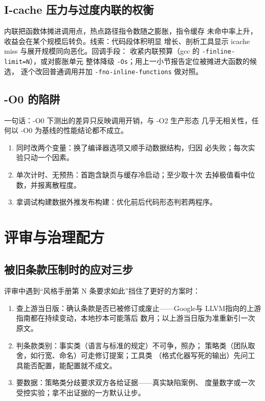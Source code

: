 \documentclass[12pt,a4paper,fontset=fandol]{ctexbook}
\newcommand{\Tp}[1]{\texttt{#1}}
\newcommand{\Lang}[1]{\textsf{#1}}
\newcommand{\DomGo}{\Lang{Google}}
\newcommand{\DomLlvm}{\Lang{LLVM}}
\begin{document}
\subsection{I-cache 压力与过度内联的权衡}

内联把函数体摊进调用点，热点路径指令数随之膨胀，指令缓存
未命中率上升，收益会在某个规模后转负。线索：代码段体积明显
增长、剖析工具显示 icache miss 与展开规模同向恶化。回调手段：
收紧内联预算（gcc 的 \Tp{-finline-limit=N}），或对膨胀单元
整体降级 \Tp{-Os}；用上一小节报告定位被摊进大函数的候选，
逐个改回普通调用并加 \Tp{-fno-inline-functions} 做对照。

\subsection{-O0 的陷阱}

一句话：-O0 下测出的差异只反映调用开销，与 -O2 生产形态
几乎无相关性，任何以 -O0 为基线的性能结论都不成立。

\begin{warning}[title={三条最常见的实验设计错误}]
\begin{enumerate}
\item 同时改两个变量：换了编译器选项又顺手动数据结构，归因
      必失败；每次实验只动一个因素。
\item 单次计时、无预热：首跑含缺页与缓存冷启动；至少取十次
      去掉极值看中位数，并报离散程度。
\item 拿调试构建数据外推发布构建：优化前后代码形态判若两程序。
\end{enumerate}
\end{warning}

\section{评审与治理配方}

\subsection{被旧条款压制时的应对三步}

评审中遇到``风格手册第 N 条要求如此''挡住了更好的方案时：

\begin{enumerate}
\item 查上游当日版：确认条款是否已被修订或废止——\DomGo 与
      \DomLlvm 指向的上游指南都在持续变动，本地抄本可能落后
      数月；以上游当日版为准重新引一次原文。
\item 判条款类别：事实类（语言与标准的规定）不可争，照办；
      策略类（团队取舍，如行宽、命名）可走修订提案；工具类
      （格式化器写死的输出）先问工具能否配置，能配置就不成文。
\item 要数据：策略类分歧要求双方各给证据——真实缺陷案例、
      度量数字或一次受控实验；拿不出证据的一方默认让步。
\end{enumerate}
\end{document}
